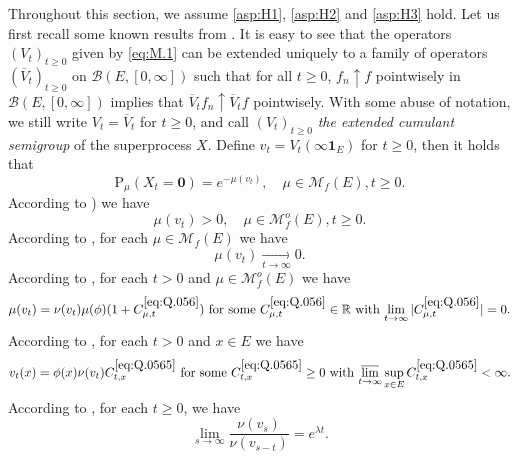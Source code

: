 \documentclass[12pt,a4paper]{amsart}
\numberwithin{equation}{section}
\theoremstyle{plain}
\theoremstyle{definition}
\theoremstyle{remark}
\begin{document}
	Throughout this section, we assume \eqref{asp:H1}, \eqref{asp:H2} and \eqref{asp:H3} hold.
	Let us first recall some known results from \cite{LiuRenSongSun2020}.
	It is easy to see that the operators $(V_t)_{t\geq 0}$
	given by \eqref{eq:M.1} can be extended uniquely to a family of operators $(\overline V_t)_{t\geq 0}$ on $\mathcal B(E,[0,\infty])$ such that for all $t\geq 0$, $f_n \uparrow f$ pointwisely in  $\mathcal B(E, [0,\infty])$ implies that $\overline V_tf_n \uparrow \overline V_tf$ pointwisely.
	With some abuse of notation, we still write $V_t = \overline V_t$ for $t\geq 0$, and call $(V_t)_{t\geq 0}$ \emph{the extended cumulant semigroup} of the superprocess $X$.
	Define $v_t = V_t(\infty  \mathbf 1_E)$ for $t\geq 0$, then it holds that
	\begin{equation} \label{eq:Q.04}
	\mathrm P_\mu (X_t = \mathbf 0)
	= e^{- \mu (v_t)},
	\quad \mu \in \mathcal M_f(E), t\geq 0.
	\end{equation}
	According to \cite[(1.10)]{LiuRenSongSun2020}) we have
\begin{equation}\label{eq:Q.05}
	\mu(v_t) > 0, \quad \mu \in \mathcal M_f^o(E), t \geq 0.
\end{equation}
	According to \cite[Proposition 1.3]{LiuRenSongSun2020}, for each $\mu\in \mathcal M_f(E)$ we have
\begin{equation} \label{eq:Q.055}
	\mu(v_t) \xrightarrow[t\to \infty]{} 0.
\end{equation}
	According to \cite[(1.17)]{LiuRenSongSun2020}, for each $t>0$ and $\mu \in \mathcal M_f^o(E)$ we have
\begin{equation} \label{eq:Q.056}
	\text{$\mu(v_t) = \nu(v_t)\mu(\phi) (1+C_{\mu,t}^{\eqref{eq:Q.056}})$ for some $C_{\mu,t}^{\eqref{eq:Q.056}}\in \mathbb R$ with $\lim_{t\to \infty}|C_{\mu,t}^{\eqref{eq:Q.056}}| = 0$.}
\end{equation}
	According to \cite[(2.14)]{LiuRenSongSun2020}, for each $t>0$ and $x\in E$ we have
\begin{equation}  \label{eq:Q.0565}
	\text{$v_t(x) = \phi(x) \nu(v_t) C_{t,x}^{\eqref{eq:Q.0565}}$ for some $C_{t,x}^{\eqref{eq:Q.0565}}\geq 0$ with $\varlimsup_{t\to \infty}\sup_{x\in E}C_{t,x}^{\eqref{eq:Q.0565}}<\infty$.}
\end{equation}
	According to \cite[(2.20)]{LiuRenSongSun2020}, for each $t\geq 0$, we have
\begin{equation}\label{eq:Q.057}
	\lim_{s\to \infty} \frac{\nu(v_s)}{\nu(v_{s-t})} = e^{\lambda t}.
\end{equation}
\end{document}
